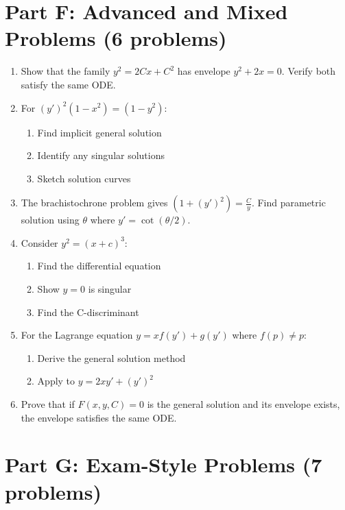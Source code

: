\documentclass[12pt]{article}
\begin{document}
\section*{Part F: Advanced and Mixed Problems (6 problems)}

\begin{enumerate}[resume]
\item Show that the family $y^2 = 2Cx + C^2$ has envelope $y^2 + 2x = 0$. Verify both satisfy the same ODE.

\item For $(y')^2(1 - x^2) = (1 - y^2)$:
    \begin{enumerate}
        \item Find implicit general solution
        \item Identify any singular solutions
        \item Sketch solution curves
    \end{enumerate}

\item The brachistochrone problem gives $(1 + (y')^2) = \frac{C}{y}$. Find parametric solution using $\theta$ where $y' = \cot(\theta/2)$.

\item Consider $y^2 = (x + c)^3$:
    \begin{enumerate}
        \item Find the differential equation
        \item Show $y = 0$ is singular
        \item Find the C-discriminant
    \end{enumerate}

\item For the Lagrange equation $y = xf(y') + g(y')$ where $f(p) \neq p$:
    \begin{enumerate}
        \item Derive the general solution method
        \item Apply to $y = 2xy' + (y')^2$
    \end{enumerate}

\item Prove that if $F(x,y,C) = 0$ is the general solution and its envelope exists, the envelope satisfies the same ODE.
\end{enumerate}

\section*{Part G: Exam-Style Problems (7 problems)}
\end{document}
